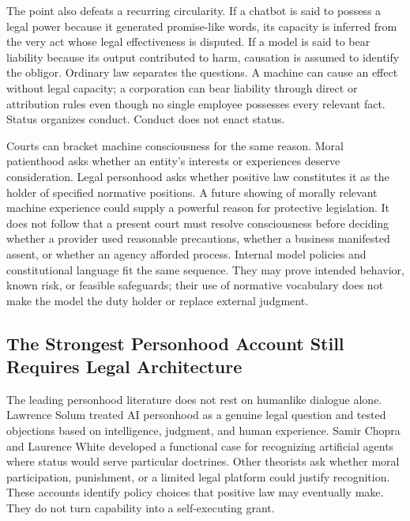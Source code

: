 The point also defeats a recurring circularity. If a chatbot is said to possess a legal power because it generated promise-like words, its capacity is inferred from the very act whose legal effectiveness is disputed. If a model is said to bear liability because its output contributed to harm, causation is assumed to identify the obligor. Ordinary law separates the questions. A machine can cause an effect without legal capacity; a corporation can bear liability through direct or attribution rules even though no single employee possesses every relevant fact. Status organizes conduct. Conduct does not enact status.

Courts can bracket machine consciousness for the same reason. Moral patienthood asks whether an entity's interests or experiences deserve consideration. Legal personhood asks whether positive law constitutes it as the holder of specified normative positions. A future showing of morally relevant machine experience could supply a powerful reason for protective legislation. It does not follow that a present court must resolve consciousness before deciding whether a provider used reasonable precautions, whether a business manifested assent, or whether an agency afforded process. Internal model policies and constitutional language fit the same sequence. They may prove intended behavior, known risk, or feasible safeguards; their use of normative vocabulary does not make the model the duty holder or replace external judgment.

\subsection{The Strongest Personhood Account Still Requires Legal Architecture}

The leading personhood literature does not rest on humanlike dialogue alone. Lawrence Solum treated AI personhood as a genuine legal question and tested objections based on intelligence, judgment, and human experience. Samir Chopra and Laurence White developed a functional case for recognizing artificial agents where status would serve particular doctrines. Other theorists ask whether moral participation, punishment, or a limited legal platform could justify recognition. These accounts identify policy choices that positive law may eventually make. They do not turn capability into a self-executing grant.

